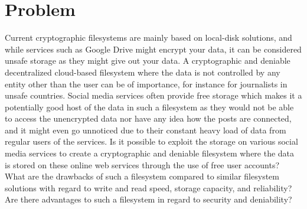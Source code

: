 
\section{Problem}
\label{sec:problem}

Current cryptographic filesystems are mainly based on local-disk solutions, and while services such as Google Drive might encrypt your data, it can be considered unsafe storage as they might give out your data. A cryptographic and deniable decentralized cloud-based filesystem where the data is not controlled by any entity other than the user can be of importance, for instance for journalists in unsafe countries. Social media services often provide free storage which makes it a potentially good host of the data in such a filesystem as they would not be able to access the unencrypted data nor have any idea how the posts are connected, and it might even go unnoticed due to their constant heavy load of data from regular users of the services. Is it possible to exploit the storage on various social media services to create a cryptographic and deniable filesystem where the data is stored on these online web services through the use of free user accounts? What are the drawbacks of such a filesystem compared to similar filesystem solutions with regard to write and read speed, storage capacity, and reliability? Are there advantages to such a filesystem in regard to security and deniability? 



